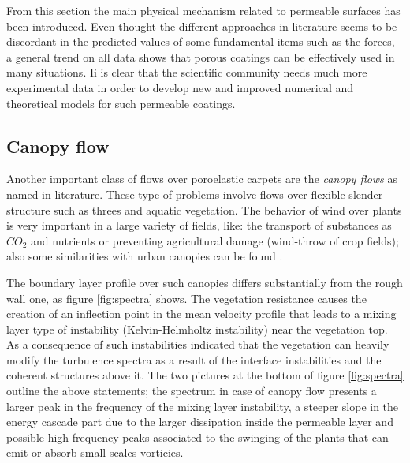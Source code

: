 From this section the main physical mechanism related to permeable surfaces has been introduced.
Even thought the different approaches in literature seems to be discordant in the predicted values of some fundamental items such as the forces, a general trend on all  data shows that porous coatings can be effectively used in many situations.
Ii is clear that the scientific community needs much more experimental data in order to develop new and improved numerical and theoretical models for such permeable coatings.

\subsection{Canopy flow}

Another important class of flows over poroelastic carpets are the \textit{canopy flows} as named in literature.
These type of problems involve flows over flexible slender structure such as threes and aquatic vegetation.
The behavior of wind over plants is very important in a large variety of fields, like: the transport of substances as $CO_2$ and nutrients or preventing agricultural damage (wind-throw of crop fields); also some similarities with urban canopies can be found \citet{ghisalberti2009obstructed}.

The boundary layer profile over such canopies differs substantially from the rough wall one, as figure \ref{fig:spectra} shows.
The vegetation resistance causes the creation of an inflection point in the mean velocity profile that leads to a mixing layer type of instability (Kelvin-Helmholtz instability) near the vegetation top.
As a consequence of such instabilities \citet{finnigan2000turbulence} indicated that the vegetation can heavily modify the turbulence spectra as a result of the interface instabilities and the coherent structures above it.
The two pictures at the bottom of figure \ref{fig:spectra} outline the above statements; the spectrum in case of canopy flow presents a larger peak in the frequency of the mixing layer instability, a steeper slope in the energy cascade part due to the larger dissipation inside the permeable layer and possible high frequency peaks associated to the swinging of the plants that can emit or absorb small scales vorticies.
 
